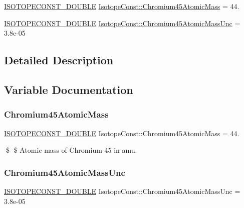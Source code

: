 \begin{DoxyCompactItemize}
\item 
\mbox{\hyperlink{group___isotope_const-_macros_ga8f45a7272ce02c0b4c65c44636ed719a}{I\+S\+O\+T\+O\+P\+E\+C\+O\+N\+S\+T\+\_\+\+D\+O\+U\+B\+LE}} \mbox{\hyperlink{group___isotope_const-_chromium-_cr45_gaba17425bf9b087c9bc0e24649c620b88}{Isotope\+Const\+::\+Chromium45\+Atomic\+Mass}} = 44.
\item 
\mbox{\hyperlink{group___isotope_const-_macros_ga8f45a7272ce02c0b4c65c44636ed719a}{I\+S\+O\+T\+O\+P\+E\+C\+O\+N\+S\+T\+\_\+\+D\+O\+U\+B\+LE}} \mbox{\hyperlink{group___isotope_const-_chromium-_cr45_ga768358f6c344cacb3ca35e0da8619c54}{Isotope\+Const\+::\+Chromium45\+Atomic\+Mass\+Unc}} = 3.\+8e-\/05
\end{DoxyCompactItemize}


\subsection{Detailed Description}


\subsection{Variable Documentation}
\mbox{\label{group___isotope_const-_chromium-_cr45_gaba17425bf9b087c9bc0e24649c620b88}} 
\subsubsection{\texorpdfstring{Chromium45\+Atomic\+Mass}{Chromium45AtomicMass}}
{\footnotesize\ttfamily \mbox{\hyperlink{group___isotope_const-_macros_ga8f45a7272ce02c0b4c65c44636ed719a}{I\+S\+O\+T\+O\+P\+E\+C\+O\+N\+S\+T\+\_\+\+D\+O\+U\+B\+LE}} Isotope\+Const\+::\+Chromium45\+Atomic\+Mass = 44.}

\$ \$ Atomic mass of Chromium-\/45 in amu. \mbox{\label{group___isotope_const-_chromium-_cr45_ga768358f6c344cacb3ca35e0da8619c54}} 
\subsubsection{\texorpdfstring{Chromium45\+Atomic\+Mass\+Unc}{Chromium45AtomicMassUnc}}
{\footnotesize\ttfamily \mbox{\hyperlink{group___isotope_const-_macros_ga8f45a7272ce02c0b4c65c44636ed719a}{I\+S\+O\+T\+O\+P\+E\+C\+O\+N\+S\+T\+\_\+\+D\+O\+U\+B\+LE}} Isotope\+Const\+::\+Chromium45\+Atomic\+Mass\+Unc = 3.\+8e-\/05}

